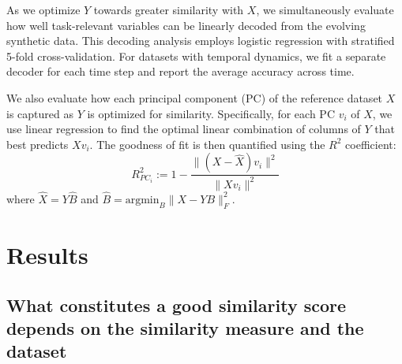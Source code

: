 \documentclass{article} %
\def\myspaceaftersections{\vspace{-0.2cm}}%
\begin{document}
As we optimize $Y$ towards greater similarity with $X$, we simultaneously evaluate how well task-relevant variables can be linearly decoded from the evolving synthetic data. This decoding analysis employs logistic regression with stratified 5-fold cross-validation. For datasets with temporal dynamics, we fit a separate decoder for each time step and report the average accuracy across time.

We also evaluate how each principal component (PC) of the reference dataset $X$ is captured as $Y$ is optimized for similarity. Specifically, for each PC $v_i$ of $X$, we use linear regression to find the optimal linear combination of columns of $Y$ that best predicts $Xv_i$. The goodness of fit is then quantified using the $R^2$ coefficient:
$$R_{PC_i}^2:= 1 - \dfrac{\| (X - \hat{X})v_i \|^2}{\|Xv_i\|^2}$$
where $\hat{X} = Y\hat{B}$ and $\hat{B} = \text{argmin}_B \| X - YB\|^2_F$.




\section{Results} \myspaceaftersections



\subsection{What constitutes a good similarity score depends on the similarity measure and the dataset}
\end{document}
